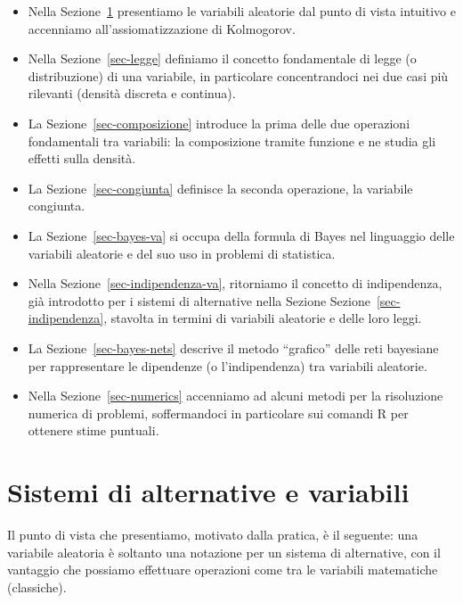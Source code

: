 \documentclass[
  italian,
  letterpaper,
]{book}
\theoremstyle{definition}
\theoremstyle{remark}
\begin{document}
\begin{itemize}
\item
  Nella Sezione~\ref{sec-def-va} presentiamo le variabili aleatorie dal
  punto di vista intuitivo e accenniamo all'assiomatizzazione di
  Kolmogorov.
\item
  Nella Sezione~\ref{sec-legge} definiamo il concetto fondamentale di
  legge (o distribuzione) di una variabile, in particolare
  concentrandoci nei due casi più rilevanti (densità discreta e
  continua).
\item
  La Sezione~\ref{sec-composizione} introduce la prima delle due
  operazioni fondamentali tra variabili: la composizione tramite
  funzione e ne studia gli effetti sulla densità.
\item
  La Sezione~\ref{sec-congiunta} definisce la seconda operazione, la
  variabile congiunta.
\item
  La Sezione~\ref{sec-bayes-va} si occupa della formula di Bayes nel
  linguaggio delle variabili aleatorie e del suo uso in problemi di
  statistica.
\item
  Nella Sezione~\ref{sec-indipendenza-va}, ritorniamo il concetto di
  indipendenza, già introdotto per i sistemi di alternative nella
  Sezione Sezione~\ref{sec-indipendenza}, stavolta in termini di
  variabili aleatorie e delle loro leggi.
\item
  La Sezione~\ref{sec-bayes-nets} descrive il metodo ``grafico'' delle
  reti bayesiane per rappresentare le dipendenze (o l'indipendenza) tra
  variabili aleatorie.
\item
  Nella Sezione~\ref{sec-numerics} accenniamo ad alcuni metodi per la
  risoluzione numerica di problemi, soffermandoci in particolare sui
  comandi R per ottenere stime puntuali.
\end{itemize}

\section{Sistemi di alternative e variabili}\label{sec-def-va}

Il punto di vista che presentiamo, motivato dalla pratica, è il
seguente: una variabile aleatoria è soltanto una notazione per un
sistema di alternative, con il vantaggio che possiamo effettuare
operazioni come tra le variabili matematiche (classiche).
\end{document}
